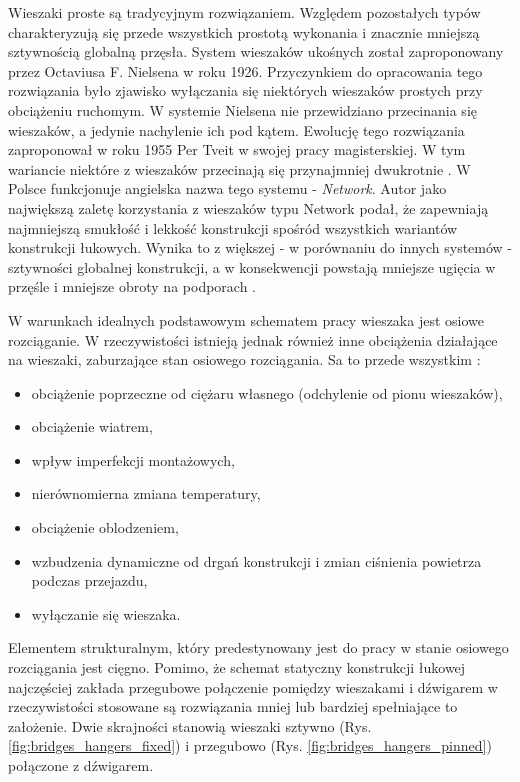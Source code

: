Wieszaki proste są tradycyjnym rozwiązaniem. Względem pozostałych typów charakteryzują się przede wszystkich prostotą wykonania i znacznie mniejszą sztywnością globalną przęsła. System wieszaków ukośnych został zaproponowany przez Octaviusa F. Nielsena w roku 1926. Przyczynkiem do opracowania tego rozwiązania było zjawisko wyłączania się niektórych wieszaków prostych przy obciążeniu ruchomym. W systemie Nielsena nie przewidziano przecinania się wieszaków, a jedynie nachylenie ich pod kątem. Ewolucję tego rozwiązania zaproponował w roku 1955 Per Tveit w swojej pracy magisterskiej. W tym wariancie niektóre z wieszaków przecinają się przynajmniej dwukrotnie \parencite{Tveit2019}. W Polsce funkcjonuje angielska nazwa tego systemu - \textit{Network}. Autor \cite{Tveit2019} jako największą zaletę korzystania z wieszaków typu Network podał, że zapewniają najmniejszą smukłość i lekkość konstrukcji spośród wszystkich wariantów konstrukcji łukowych. Wynika to z większej - w porównaniu do innych systemów - sztywności globalnej konstrukcji, a w konsekwencji powstają mniejsze ugięcia w przęśle i mniejsze obroty na podporach \cite{Zotowski2005}.

W warunkach idealnych podstawowym schematem pracy wieszaka jest osiowe rozciąganie. W rzeczywistości istnieją jednak również inne obciążenia działające na wieszaki, zaburzające stan osiowego rozciągania. Sa to przede wszystkim \parencite{Zobel2015}:
\begin{itemize}
	\item obciążenie poprzeczne od ciężaru własnego (odchylenie od pionu wieszaków),
	\item obciążenie wiatrem,
	\item wpływ imperfekcji montażowych,
	\item nierównomierna zmiana temperatury,
	\item obciążenie oblodzeniem,
	\item wzbudzenia dynamiczne od drgań konstrukcji i zmian ciśnienia powietrza podczas przejazdu,
	\item wyłączanie się wieszaka.
\end{itemize}

Elementem strukturalnym, który predestynowany jest do pracy w stanie osiowego rozciągania jest cięgno. Pomimo, że schemat statyczny konstrukcji łukowej najczęściej zakłada przegubowe połączenie pomiędzy wieszakami i dźwigarem w rzeczywistości stosowane są rozwiązania mniej lub bardziej spełniające to założenie. Dwie skrajności stanowią wieszaki sztywno (Rys. \ref{fig:bridges_hangers_fixed}) i przegubowo (Rys. \ref{fig:bridges_hangers_pinned}) połączone z dźwigarem. 

